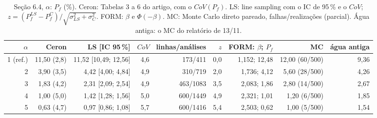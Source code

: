 \begin{table}[htbp]\centering\scriptsize\setlength{\tabcolsep}{3pt}
\caption{Seção 6.4, $\alpha$: $P_f$ (\%). Ceron: Tabelas 3 a 6 do artigo, com o $CoV(P_f)$. LS: line sampling com o IC de 95\,\% e o $CoV$; $z = (P_f^{LS} - P_f^{C})/\sqrt{\sigma_{LS}^2 + \sigma_C^2}$. FORM: $\beta$ e $\Phi(-\beta)$. MC: Monte Carlo direto pareado, falhas/realizações (parcial). Água antiga: o MC do relatório de 13/11.}\label{tab:pf_alfa}
\begin{tabular}{rrrrrrrrr}\toprule
$\alpha$ & Ceron & LS [IC 95\,\%] & $CoV$ & linhas/análises & $z$ & FORM: $\beta$; $P_f$ & MC & água antiga \\\midrule
1 (ref.) & 11{,}50 (2{,}8) & 11{,}52 [10{,}49; 12{,}56] & 4{,}6 & 173/411 & 0{,}0 & 1{,}152; 12{,}48 & 12{,}00 (60/500) & 9{,}36 \\
2 & 3{,}90 (3{,}5) & 4{,}42 [4{,}00; 4{,}84] & 4{,}9 & 310/719 & 2{,}0 & 1{,}736; 4{,}12 & 5{,}60 (28/500) & 4{,}26 \\
3 & 1{,}83 (4{,}2) & 2{,}31 [2{,}09; 2{,}54] & 4{,}9 & 463/1083 & 3{,}5 & 2{,}083; 1{,}86 & 2{,}80 (14/500) & 2{,}67 \\
4 & 1{,}00 (5{,}0) & 1{,}42 [1{,}28; 1{,}56] & 5{,}0 & 600/1449 & 4{,}9 & 2{,}321; 1{,}01 & 1{,}20 (6/500) & 1{,}85 \\
5 & 0{,}63 (4{,}7) & 0{,}97 [0{,}86; 1{,}08] & 5{,}7 & 600/1416 & 5{,}4 & 2{,}503; 0{,}62 & 1{,}00 (5/500) & 1{,}54 \\
\bottomrule\end{tabular}\end{table}

